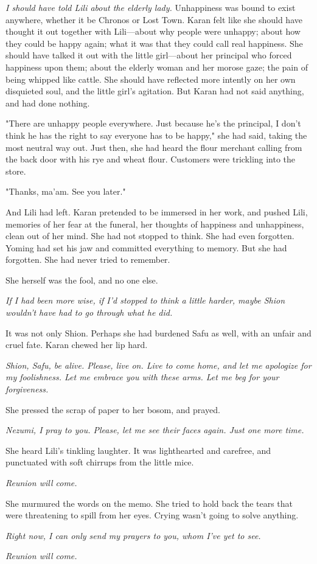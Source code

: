 \emph{I should have told Lili about the elderly lady.} Unhappiness was bound to
exist anywhere, whether it be Chronos or Lost Town. Karan felt like she
should have thought it out together with Lili---about why people were
unhappy; about how they could be happy again; what it was that they
could call real happiness. She should have talked it out with the little
girl---about her principal who forced happiness upon them; about the
elderly woman and her morose gaze; the pain of being whipped like
cattle. She should have reflected more intently on her own disquieted
soul, and the little girl's agitation. But Karan had not said anything,
and had done nothing.

"There are unhappy people everywhere. Just because he's the principal, I
don't think he has the right to say everyone has to be happy," she had
said, taking the most neutral way out. Just then, she had heard the
flour merchant calling from the back door with his rye and wheat flour.
Customers were trickling into the store.

"Thanks, ma'am. See you later."

And Lili had left. Karan pretended to be immersed in her work, and
pushed Lili, memories of her fear at the funeral, her thoughts of
happiness and unhappiness, clean out of her mind. She had not stopped to
think. She had even forgotten. Yoming had set his jaw and committed
everything to memory. But she had forgotten. She had never tried to
remember.

She herself was the fool, and no one else.

\emph{If I had been more wise, if I'd stopped to think a little harder, maybe
Shion wouldn't have had to go through what he did.}

It was not only Shion. Perhaps she had burdened Safu as well, with an
unfair and cruel fate. Karan chewed her lip hard.

\emph{Shion, Safu, be alive. Please, live on. Live to come home, and let me
apologize for my foolishness. Let me embrace you with these arms. Let me
beg for your forgiveness.}

She pressed the scrap of paper to her bosom, and prayed.


\emph{Nezumi, I pray to you. Please, let me see their faces again. Just one
more time.}

She heard Lili's tinkling laughter. It was lighthearted and carefree,
and punctuated with soft chirrups from the little mice.

\emph{Reunion will come.}

She murmured the words on the memo. She tried to hold back the tears
that were threatening to spill from her eyes. Crying wasn't going to
solve anything.

\emph{Right now, I can only send my prayers to you, whom I've yet to see.}

\emph{Reunion will come.}
